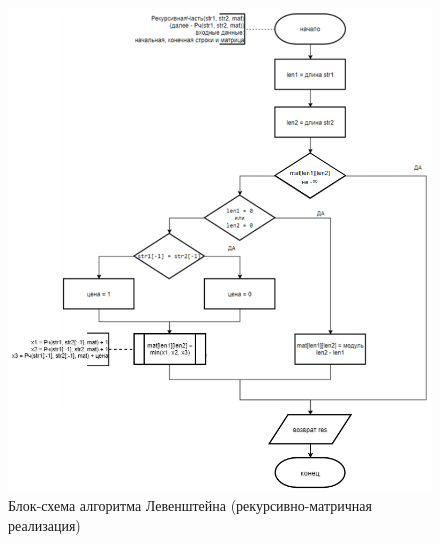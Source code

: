 \begin{figure}[H]
    \centering
    \includegraphics[width=1.05\textwidth]{img/block_1_3_1.png}
    \caption{Блок-схема алгоритма Левенштейна (рекурсивно-матричная реализация)}
    \label{fig:block_1_3_1}
\end{figure}

